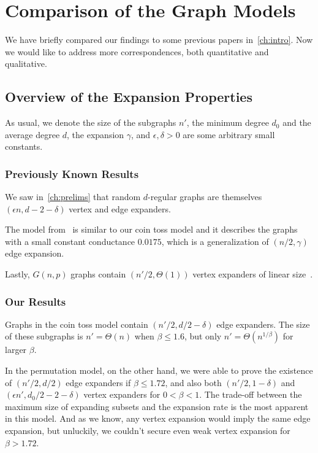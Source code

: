 \chapter{Comparison of the Graph Models}
\label{ch:comparison}

We have briefly compared our findings to some previous papers in~\autoref{ch:intro}.
Now we would like to address more correspondences, both quantitative and qualitative.

\section{Overview of the Expansion Properties}

As usual, we denote the size of the subgraphs $n'$,
the minimum degree $d_0$ and the average degree $d$,
the expansion $\gamma$, and $\epsilon,\delta>0$ are some arbitrary small constants.

\subsection{Previously Known Results}

We saw in~\autoref{ch:prelims} that random $d$-regular graphs are
themselves $(\epsilon n,d-2-\delta)$ vertex and edge expanders.

The model from~\cite{gms03} is similar to our coin toss model
and it describes the graphs with a small constant conductance $0.0175$,
which is a generalization of $(n/2,\gamma)$ edge expansion.

Lastly, $G(n,p)$ graphs contain $(n'/2,\Theta(1))$ vertex expanders of linear size~\cite{kri17}.

\subsection{Our Results}

Graphs in the coin toss model contain $(n'/2,d/2-\delta)$ edge expanders.
The size of these subgraphs is $n'=\Theta(n)$ when $\beta\leq 1.6$,
but only $n'=\Theta\left(n^{1/\beta}\right)$ for larger $\beta$.

In the permutation model, on the other hand, we were able to prove
the existence of $(n'/2,d/2)$ edge expanders if $\beta\leq 1.72$,
and also both $(n'/2,1-\delta)$ and $(\epsilon n',d_0/2-2-\delta)$
vertex expanders for $0<\beta<1$.
The trade-off between the maximum size of expanding subsets
and the expansion rate is the most apparent in this model.
And as we know, any vertex expansion would imply the same edge expansion,
but unluckily, we couldn't secure even weak vertex expansion for $\beta>1.72$.

